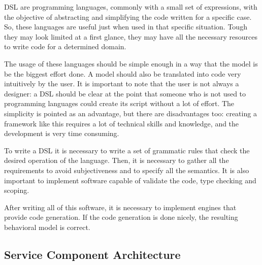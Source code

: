 \documentclass[11pt]{report}
\begin{document}
		\par DSL are programming languages, commonly with a small set of expressions, with the objective of abstracting and simplifying the code written for a specific case. So, these languages are useful just when used in that specific situation. Tough they may look limited at a first glance, they may have all the necessary resources to write code for a determined domain.
		\par The usage of these languages should be simple enough in a way that the model is be the biggest effort done. A model should also be translated into code very intuitively by the user. It is important to note that the user is not always a designer: a DSL should be clear at the point that someone who is not used to programming languages could create its script without a lot of effort. The simplicity is pointed as an advantage, but there are disadvantages too: creating a framework like this requires a lot of technical skills and knowledge, and the development is very time consuming.
		\par To write a DSL it is necessary to write a set of grammatic rules that check the desired operation of the language. Then, it is necessary to gather all the requirements to avoid subjectiveness and to specify all the semantics. It is also important to implement software capable of validate the code, type checking and scoping.
		\par After writing all of this software, it is necessary to implement engines that provide code generation. If the code generation is done nicely, the resulting behavioral model is correct.
		
		\subsection{Service Component Architecture}
		
\end{document}
